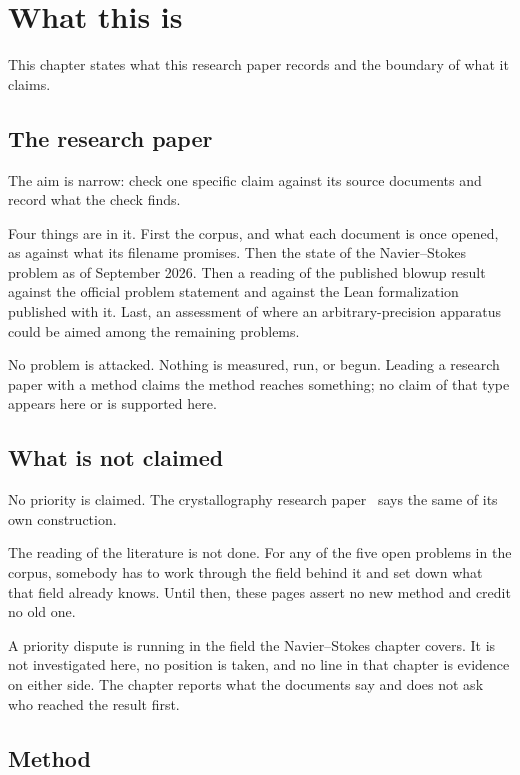 \chapter{What this is}

This chapter states what this research paper records and the boundary of what it claims.

\section{The research paper}

The aim is narrow: check one specific claim against its source documents and record what the check
finds.

Four things are in it. First the corpus, and what each document is once opened, as against what its
filename promises. Then the state of the Navier--Stokes problem as of September 2026. Then a reading
of the published blowup result against the official problem statement and against the Lean
formalization published with it. Last, an assessment of where an arbitrary-precision apparatus could
be aimed among the remaining problems.

No problem is attacked. Nothing is measured, run, or begun. Leading a research paper with a method
claims the method reaches something; no claim of that type appears here or is supported here.

\section{What is not claimed}

No priority is claimed. The crystallography research paper~\cite{src:Quigg-crystallography} says the
same of its own construction.

The reading of the literature is not done. For any of the five open problems in the corpus, somebody
has to work through the field behind it and set down what that field already knows. Until then,
these pages assert no new method and credit no old one.

A priority dispute is running in the field the Navier--Stokes chapter covers. It is not investigated
here, no position is taken, and no line in that chapter is evidence on either side. The chapter
reports what the documents say and does not ask who reached the result first.

\section{Method}

